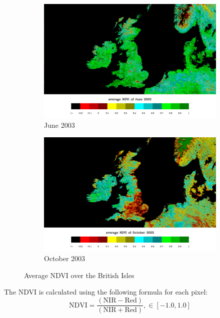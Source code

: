 \begin{figure}[H]
\begin{subfigure}{0.5\textwidth}
\centering
\includegraphics[scale=0.25]{images/NDVI_062003.png}
\caption{June 2003}
\end{subfigure}
\begin{subfigure}{0.5\textwidth}
\centering
\includegraphics[scale=0.25]{images/NDVI_102003.png}
\caption{October 2003}
\end{subfigure}
\caption{Average NDVI over the British Isles \cite{ndvi_wiki}}
\label{fig:ndvi_british}
\end{figure}

The NDVI is calculated using the following formula for each pixel:\\

\begin{equation}\label{eq:ndvi}
{\displaystyle{\mbox{NDVI}}={\frac {({\mbox{NIR}}-{\mbox{Red}})}{({\mbox{NIR}}+{\mbox{Red}})}}}, \in [-1.0, 1.0]
\end{equation}

